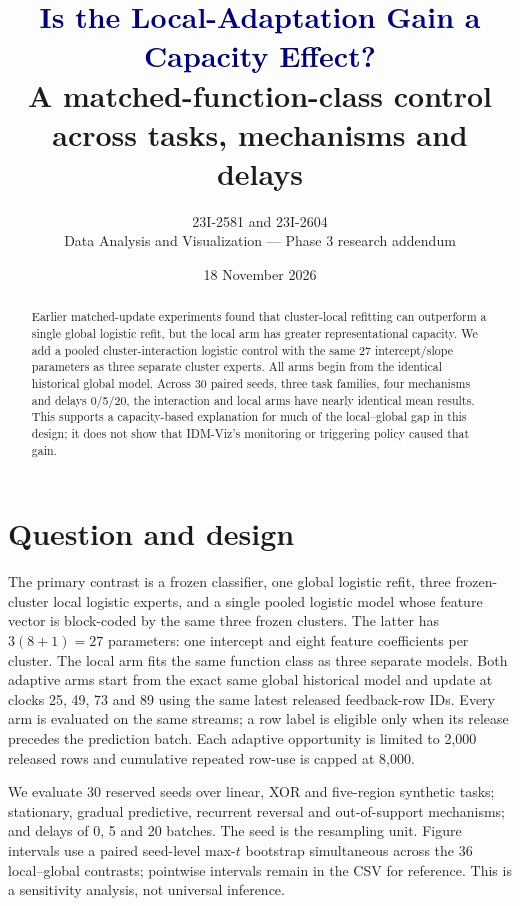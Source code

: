 \documentclass[10pt]{article}
\title{\textcolor{navy}{Is the Local-Adaptation Gain a Capacity Effect?}\\[3pt]
\large A matched-function-class control across tasks, mechanisms and delays}
\author{23I-2581 and 23I-2604\\Data Analysis and Visualization --- Phase 3 research addendum}
\date{18 November 2026}
\begin{document}
\maketitle
\begin{abstract}
Earlier matched-update experiments found that cluster-local refitting can outperform a single global logistic refit, but the local arm has greater representational capacity. We add a pooled cluster-interaction logistic control with the same 27 intercept/slope parameters as three separate cluster experts. All arms begin from the identical historical global model. Across 30 paired seeds, three task families, four mechanisms and delays 0/5/20, the interaction and local arms have nearly identical mean results. This supports a capacity-based explanation for much of the local--global gap in this design; it does not show that IDM-Viz's monitoring or triggering policy caused that gain.
\end{abstract}
\section{Question and design}
The primary contrast is a frozen classifier, one global logistic refit, three frozen-cluster local logistic experts, and a single pooled logistic model whose feature vector is block-coded by the same three frozen clusters. The latter has $3(8+1)=27$ parameters: one intercept and eight feature coefficients per cluster. The local arm fits the same function class as three separate models. Both adaptive arms start from the exact same global historical model and update at clocks 25, 49, 73 and 89 using the same latest released feedback-row IDs. Every arm is evaluated on the same streams; a row label is eligible only when its release precedes the prediction batch. Each adaptive opportunity is limited to 2,000 released rows and cumulative repeated row-use is capped at 8,000.

We evaluate 30 reserved seeds over linear, XOR and five-region synthetic tasks; stationary, gradual predictive, recurrent reversal and out-of-support mechanisms; and delays of 0, 5 and 20 batches. The seed is the resampling unit. Figure intervals use a paired seed-level max-$t$ bootstrap simultaneous across the 36 local--global contrasts; pointwise intervals remain in the CSV for reference. This is a sensitivity analysis, not universal inference.
\end{document}
